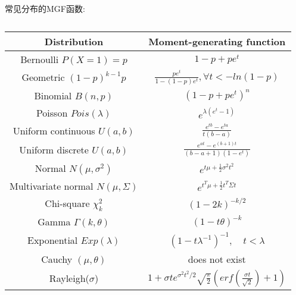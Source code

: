 \documentclass[fontset=none,oneside]{book}
\begin{document}
常见分布的MGF函数:
\begin{table}[htbp]
\centering
\begin{tabular}{|c|c|}
\hline Distribution & Moment-generating function \\
\hline Bernoulli $P(X=1)=p$ & $1-p+pe^{t}$ \\
\hline Geometric $(1-p)^{k-1}p$ & $\frac{pe^{t}}{1-(1-p)e^{t}},\forall
                                  t < -ln(1-p)$ \\
\hline Binomial $B(n,p)$ & $(1-p+pe^{t})^{n}$ \\
\hline Poisson $Pois(\lambda)$ & $e^{\lambda(e^{t}-1)}$ \\
\hline Uniform continuous $U(a,b)$ & $\frac{e^{tb}-e^{ta}}{t(b-a)}$ \\
\hline Uniform discrete $U(a,b)$ &
                                   $\frac{e^{at}-e^{(b+1)t}}{(b-a+1)(1-e^{t})}$
  \\
\hline Normal $N(\mu,\sigma^{2})$ &
                                    $e^{t\mu+\frac{1}{2}\sigma^{2}t^{2}}$
  \\
\hline Multivariate normal $N(\mu,\Sigma)$ &
                                             $e^{t^{T}\mu+\frac{1}{2}t^{T}\Sigma
                                             t}$ \\
\hline Chi-square $\chi_{k}^{2}$ & $(1-2k)^{-k/2}$ \\
\hline Gamma $\Gamma(k,\theta)$ & $(1-t\theta)^{-k}$ \\
\hline Exponential $Exp(\lambda)$ & $(1-t\lambda^{-1})^{-1},\quad
                                    t<\lambda$ \\
\hline Cauchy $(\mu,\theta)$ & does not exist \\
\hline Rayleigh($\sigma$) & $1+\sigma
                            te^{\sigma^{2}t^{2}/2}\sqrt{\frac{\pi}{2}}(erf(\frac{\sigma
                            t}{\sqrt{2}})+1)$ \\
\hline
\end{tabular}
\caption{\label{tab:mgf}}
\end{table}

 
\end{document}
